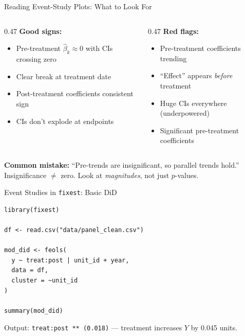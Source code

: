 \begin{frame}{Reading Event-Study Plots: What to Look For}
  \small
  \begin{columns}[T]
    \begin{column}{0.47\textwidth}
      \textbf{\textcolor{usfgreen}{Good signs:}}
      \begin{itemize}
        \item Pre-treatment $\hat\beta_k \approx 0$ with CIs crossing zero
        \item Clear break at treatment date
        \item Post-treatment coefficients consistent sign
        \item CIs don't explode at endpoints
      \end{itemize}
    \end{column}
    \begin{column}{0.47\textwidth}
      \textbf{\textcolor{red!70}{Red flags:}}
      \begin{itemize}
        \item Pre-treatment coefficients trending
        \item ``Effect'' appears \textit{before} treatment
        \item Huge CIs everywhere (underpowered)
        \item Significant pre-treatment coefficients
      \end{itemize}
    \end{column}
  \end{columns}

  \vspace{4pt}

  \textbf{Common mistake:} ``Pre-trends are insignificant, so parallel trends hold.'' Insignificance $\neq$ zero. Look at \textit{magnitudes}, not just $p$-values.
\end{frame}

\begin{frame}[fragile]{Event Studies in \texttt{fixest}: Basic DiD}
\begin{lstlisting}[style=terminal, basicstyle=\ttfamily\footnotesize\color{darkgray}]
library(fixest)

df <- read.csv("data/panel_clean.csv")

mod_did <- feols(
  y ~ treat:post | unit_id + year,
  data = df,
  cluster = ~unit_id
)

summary(mod_did)
\end{lstlisting}

  \vspace{2pt}
  {\footnotesize Output: \texttt{treat:post ** \quad (0.018)} --- treatment increases $Y$ by 0.045 units.}
\end{frame}

